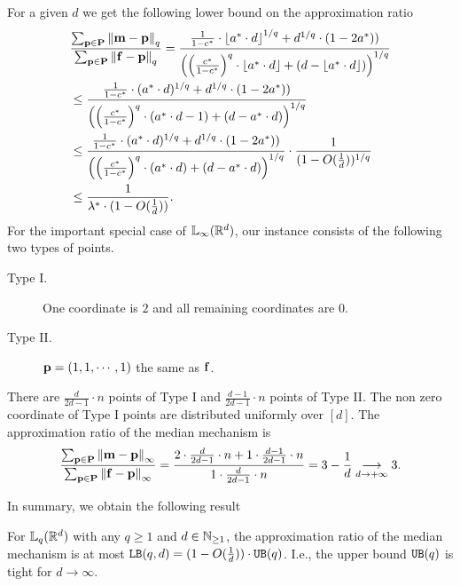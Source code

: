 For a given $d$ we get the following lower bound on the approximation ratio
\begin{align*}
    &\frac{\sum_{\loc\in\locs} \qnorm{\m-\loc}}{\sum_{\loc\in\locs} \qnorm{\facility-\loc}}=\frac{\frac{1}{1-c^*}\cdot\flr{a^*\cdot d}^{1/q}+d^{1/q}\cdot(1-2a^*))}{\left(\left(\frac{c^*}{1-c^*}\right)^q\cdot \flr{a^*\cdot d}+(d-\flr{a^*\cdot d})\right)^{1/q}}\\
    &\leq \frac{\frac{1}{1-c^*}\cdot(a^*\cdot d)^{1/q}+d^{1/q}\cdot(1-2a^*))}{\left(\left(\frac{c^*}{1-c^*}\right)^q\cdot (a^*\cdot d-1)+(d-a^*\cdot d)\right)^{1/q}}\\
    &\leq \frac{\frac{1}{1-c^*}\cdot(a^*\cdot d)^{1/q}+d^{1/q}\cdot(1-2a^*))}{\left(\left(\frac{c^*}{1-c^*}\right)^q\cdot (a^*\cdot d)+(d-a^*\cdot d)\right)^{1/q}}\cdot\frac{1}{(1-O(\frac{1}{d}))^{1/q}}\\
    &\leq \frac{1}{\lambda^*\cdot(1-O(\frac{1}{d}))}.
\end{align*}
For the important special case of $\lqnorm[\infty](\reals^d)$, our instance consists of the following two types of points.
\begin{description}
        \item[Type I.] One coordinate is $2$ and all remaining coordinates are $0$.        
        \item[Type II.] $\loc=(1,1,\cdots,1)$ the same as $\facility$.
\end{description}
There are $\frac{d}{2d-1}\cdot n$ points of Type I and $\frac{d-1}{2d-1}\cdot n$ points of Type II. The non zero coordinate of Type I points are distributed uniformly over $[d]$.  The approximation ratio of the median mechanism is
\begin{align*}
    \frac{\sum_{\loc\in\locs} \qnorm[\infty]{\m-\loc}}{\sum_{\loc\in\locs} \qnorm[\infty]{\facility-\loc}}
    = \frac{2\cdot\frac{d}{2d-1}\cdot n+1\cdot\frac{d-1}{2d-1}\cdot n}{1\cdot\frac{d}{2d-1}\cdot n}=3-\frac{1}{d}\underset{d\to+\infty}{\longrightarrow}
    3.
\end{align*}

In summary, we obtain the following result
\begin{theorem}
    \label{thm:LB}
   For $\lqnorm(\reals^d)$ with any $q\ge 1$ and $d\in\nats_{\ge 1}$, the 
   approximation ratio of the median mechanism is at most $\LB(q,d)=(1-O(\frac{1}{d}))\cdot\UB(q)$.
   I.e., the upper bound $\UB(q)$ is tight for $d\rightarrow\infty$.
\end{theorem}